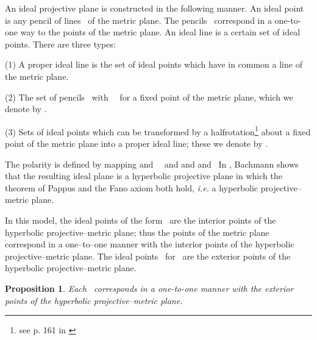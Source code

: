 \documentclass[a4paper,twoside,12pt]{article}
\newtheorem{prop}{Proposition}[section]
\begin{document}
     An ideal projective plane \myHighlight{$\Pi$}\coordHE{} is constructed in the
following manner. An ideal point is any pencil of lines \coordHE{}\ of
the metric plane. The pencils \coordHE{}\ correspond in a one-to-one way
to the points of the metric plane. An ideal line is a certain set of
ideal points.  There are three types:

   (1) A proper ideal line \coordHE{} is the set of ideal points which have in
common a line \coordHE{} of the metric plane.

   (2) The set of pencils \coordHE{}\ with \coordHE{}\ \coordHE{}\ for a fixed point \coordHE{} of
the metric plane, which we denote by \coordHE{}.

   (3) Sets of ideal points which can be transformed by a 
halfrotation\footnote{see p. 161 in \cite{BBPW}} about
a fixed point \coordHE{} of the metric plane into a proper ideal line; these we
denote by \coordHE{}.

     The polarity is defined by mapping \coordHE{} and 
\coordHE{}\ \coordHE{}\ and \coordHE{} and \coordHE{} and \coordHE{}\ In \cite{Ba}, Bachmann shows that the resulting ideal
plane is a hyperbolic projective plane in which the theorem of Pappus and
the Fano axiom both hold, {\it i.e.} a hyperbolic projective--metric plane.

     In this model, the ideal points of the form \coordHE{}\ are the
interior points of the hyperbolic projective--metric plane; thus the
points of the metric plane correspond in a one--to--one manner with the
interior points of the hyperbolic projective--metric plane. The ideal
points \coordHE{}\ for \coordHE{}\ are the exterior points of the
hyperbolic projective--metric plane.

\begin{prop} Each \coordHE{}\ corresponds in a one-to-one
manner with the exterior points of the hyperbolic projective--metric plane.
\end{prop}
\end{document}

